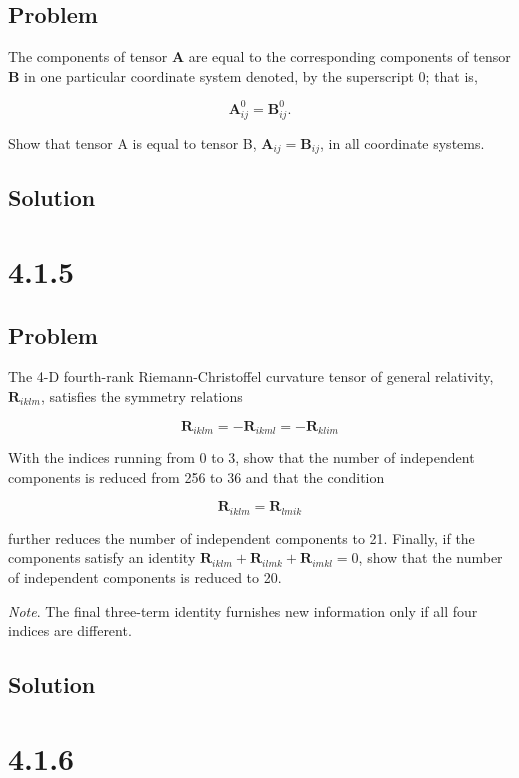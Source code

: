 \documentclass[12pt]{article}
\begin{document}
\subsection{Problem}

The components of tensor \textbf{A} are equal to the corresponding components
of tensor \textbf{B} in one particular coordinate system denoted, by the
superscript 0; that is,

\[
    \textbf{A}^0_{ij} = \textbf{B}^0_{ij}.
\]

Show that tensor A is equal to tensor B, \(\textbf{A}_{ij} = \textbf{B}_{ij}\), in all
coordinate systems.

\subsection{Solution}

\section{4.1.5}

\subsection{Problem}

The 4-D fourth-rank Riemann-Christoffel curvature tensor of general relativity,
\(\textbf{R}_{iklm}\), satisfies the symmetry relations

\[
    \textbf{R}_{iklm} = - \textbf{R}_{ikml} = - \textbf{R}_{klim}
\]

With the indices running from 0 to 3, show that the number of independent components
is reduced from 256 to 36 and that the condition

\[
    \textbf{R}_{iklm} = \textbf{R}_{lmik}
\]

further reduces the number of independent components to 21. Finally, if the components
satisfy an identity \(\textbf{R}_{iklm} + \textbf{R}_{ilmk} + \textbf{R}_{imkl} = 0\),
show that the number of independent components is reduced to 20.

\textit{Note}. The final three-term identity furnishes new
information only if all four indices are different.

\subsection{Solution}

\section{4.1.6}
\end{document}

